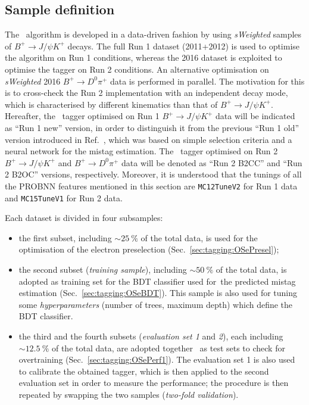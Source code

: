 
\subsection{Sample definition}

The \OSe~algorithm is developed in a data-driven fashion by using \emph{sWeighted} samples of $B^+\to J/\psi K^+$ decays. The full Run 1 dataset (2011+2012) is used to optimise the algorithm on Run 1 conditions, whereas the 2016 dataset is exploited to optimise the tagger on Run 2 conditions. An alternative optimisation on \emph{sWeighted} 2016 $B^+\to D^0 \pi^+$ data is performed in parallel. The motivation for this is to cross-check the Run 2 implementation with an independent decay mode, which is characterised by different kinematics than that of $B^+\to J/\psi K^+$.
Hereafter, the \OSe~tagger optimised on Run 1 $B^+\to J/\psi K^+$ data will be indicated as ``Run 1 new'' version, in order to distinguish it from the previous ``Run 1 old'' version introduced in Ref.~\cite{LHCb-PAPER-2011-027}, which was based on simple selection criteria and a neural network for the mistag estimation.  
The \OSe~tagger optimised on Run 2 $B^+\to J/\psi K^+$ and $B^+\to D^0 \pi^+$ data will be denoted as ``Run 2 B2CC'' and ``Run 2 B2OC'' versions, respectively.
Moreover, it is understood that the tunings of all the PROBNN features mentioned in this section are \texttt{MC12TuneV2} for Run 1 data and \texttt{MC15TuneV1} for Run 2 data.

Each dataset is divided in four subsamples:
\begin{itemize}[noitemsep,topsep=0pt]
  \item the first subset, including $\sim 25~\%$ of the total data, is used for the optimisation of the electron preselection (Sec.~\ref{sec:tagging:OSePresel});
    \item the second subset (\emph{training sample}), including $\sim 50~\%$ of the total data, is adopted as training set for the BDT classifier used for\
 the predicted mistag estimation (Sec.~\ref{sec:tagging:OSeBDT}). This sample is also used for tuning some \emph{hyperparameters} (number of trees, maximum depth) which define the BDT classifier.
 \item the third and the fourth subsets (\emph{evaluation set 1} and \emph{2}), each including $\sim 12.5~\%$ of the total data, are adopted together \
as test sets to check for overtraining (Sec.~\ref{sec:tagging:OSePerf1}). The evaluation set 1 is also used to calibrate the obtained tagger, which is then applied to the second evaluation set in order to measure the performance; the procedure is then repeated by swapping the two samples (\emph{two-fold validation}).
\end{itemize}

